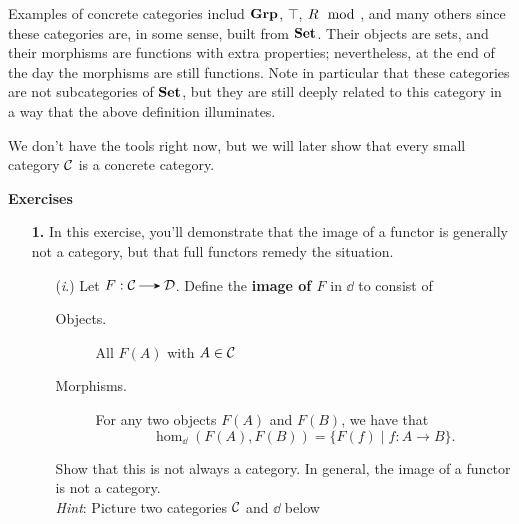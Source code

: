     Examples of concrete categories includ $\operatorname{\mathbf{Grp}}$, $\top$, $R\mod$,
    and many others since these categories are, in some sense, built from $\operatorname{\mathbf{Set}}$. 
    Their objects are sets, and their morphisms are functions with extra properties; nevertheless, 
    at the end of the day the morphisms are still functions. Note in particular 
    that these categories are not subcategories of $\operatorname{\mathbf{Set}}$, but they are still deeply 
    related to this category in a way that the above definition illuminates. 

    We don't have the tools right now, but we will later show that every small category $\mathcal{C}$
    is  a concrete category. 




    {\large \textbf{Exercises}
    \vspace{0.5cm}}
    \begin{itemize}
        \item[\textbf{1.}] 
        In this exercise, you'll demonstrate that the image of a functor is generally 
        not a category, but that full functors remedy the situation. 
        \begin{itemize}
            \item[(\emph{i}.)]
            Let $F: \cc \to \dd$. Define the \textbf{image of $F$} 
            in $\dd$ to consist of 
            \begin{description}
                \item[Objects.] All $F(A)$ with $A \in \mathcal{C}$ 
                \item[Morphisms.] For any two objects $F(A)$ and $F(B)$, we have that 
                \[
                    \hom_{\dd}(F(A),  F(B))=\{ F(f) \mid f: A \to B \}.
                \] 
            \end{description}
            Show that this is not always a category. In general, the image of a functor 
            is not a category. 
            \\
            \emph{Hint}:
            Picture two categories $\mathcal{C}$ and $\dd$ below
            \begin{center}
\end{center}
\end{itemize}
\end{itemize}
